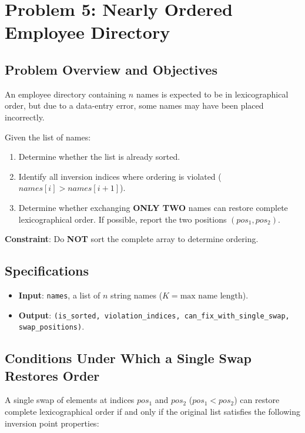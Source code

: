 \section{Problem 5: Nearly Ordered Employee Directory}

\subsection{Problem Overview and Objectives}
An employee directory containing $n$ names is expected to be in lexicographical order, but due to a data-entry error, some names may have been placed incorrectly.

Given the list of names:
\begin{enumerate}
    \item Determine whether the list is already sorted.
    \item Identify all inversion indices where ordering is violated ($names[i] > names[i+1]$).
    \item Determine whether exchanging \textbf{ONLY TWO} names can restore complete lexicographical order. If possible, report the two positions $(pos_1, pos_2)$.
\end{enumerate}
\textbf{Constraint}: Do \textbf{NOT} sort the complete array to determine ordering.

\subsection{Specifications}
\begin{itemize}
    \item \textbf{Input}: \texttt{names}, a list of $n$ string names ($K = \text{max name length}$).
    \item \textbf{Output}: \texttt{(is\_sorted, violation\_indices, can\_fix\_with\_single\_swap, swap\_positions)}.
\end{itemize}

\subsection{Conditions Under Which a Single Swap Restores Order}
A single swap of elements at indices $pos_1$ and $pos_2$ ($pos_1 < pos_2$) can restore complete lexicographical order if and only if the original list satisfies the following inversion point properties:

